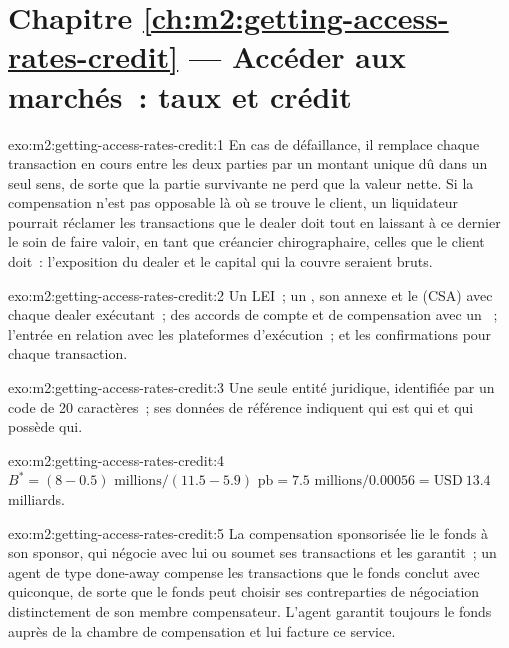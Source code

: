 \section*{Chapitre \ref{ch:m2:getting-access-rates-credit} --- Accéder aux marchés~: taux et crédit}

\begin{solution}{exo:m2:getting-access-rates-credit:1}
En cas de défaillance, il remplace chaque transaction en cours entre les deux
parties par un montant unique dû dans un seul sens, de sorte que la partie survivante ne perd que la valeur nette. Si la compensation n'est pas
opposable là où se trouve le client, un liquidateur pourrait réclamer les transactions que le dealer doit
tout en laissant à ce dernier le soin de faire valoir, en tant que créancier chirographaire, celles que le client doit~: l'exposition
du dealer et le capital qui la couvre seraient bruts.
\end{solution}

\begin{solution}{exo:m2:getting-access-rates-credit:2}
Un LEI~; un , son annexe et le  (CSA) avec chaque dealer exécutant~;
des accords de compte et de compensation avec un ~; l'entrée en relation avec les
plateformes d'exécution~; et les confirmations pour chaque transaction.
\end{solution}

\begin{solution}{exo:m2:getting-access-rates-credit:3}
Une seule entité juridique, identifiée par un code de 20 caractères~; ses données de référence indiquent qui est qui et
qui possède qui.
\end{solution}

\begin{solution}{exo:m2:getting-access-rates-credit:4}
$B^* = (8 - 0.5)\text{ millions} / (11.5 - 5.9)\text{ pb} = 7.5\text{ millions} / 0.00056 =
\text{USD}~13.4$ milliards.
\end{solution}

\begin{solution}{exo:m2:getting-access-rates-credit:5}
La compensation sponsorisée lie le fonds à son sponsor, qui négocie avec lui ou soumet ses
transactions et les garantit~; un agent de type done-away compense les transactions que le fonds conclut avec quiconque,
de sorte que le fonds peut choisir ses contreparties de négociation distinctement de son membre compensateur. L'agent
garantit toujours le fonds auprès de la chambre de compensation et lui facture ce service.
\end{solution}

